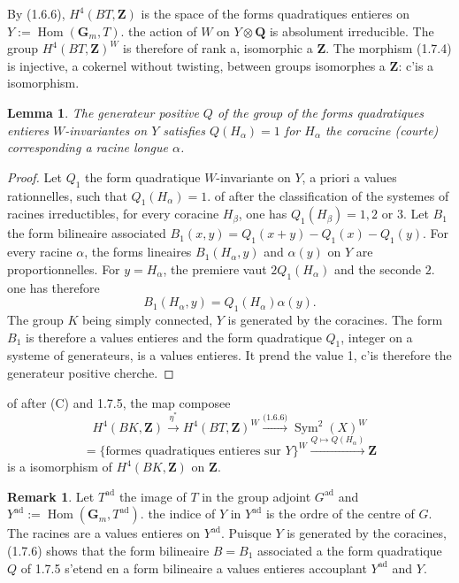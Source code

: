 \documentclass[11pt,a4paper]{article}
\theoremstyle{plain}
\newtheorem{lemma}[theorem]{Lemma}
\theoremstyle{definition}
\newtheorem{remark}[theorem]{Remark}
\DeclareMathOperator{\Sym}{Sym}
\DeclareMathOperator{\Hom}{Hom}
\DeclareMathOperator{\ad}{ad}
\begin{document}
By (1.6.6), $H^4(BT, \mathbf{Z})$ is the space of the forms quadratiques entieres on $Y := \Hom(\mathbf{G}_m, T)$. the action of $W$ on $Y \otimes \mathbf{Q}$ is absolument irreducible. The group $H^4(BT, \mathbf{Z})^W$ is therefore of rank a, isomorphic a $\mathbf{Z}$. The morphism (1.7.4) is injective, a cokernel without twisting, between groups isomorphes a $\mathbf{Z}$: c'is a isomorphism.

\begin{lemma}\label{1.7.5}
The generateur positive $Q$ of the group of the forms quadratiques entieres $W$-invariantes on $Y$ satisfies $Q(H_\alpha) = 1$ for $H_\alpha$ the coracine (courte) corresponding a racine longue $\alpha$.
\end{lemma}

\begin{proof}
Let $Q_1$ the form quadratique $W$-invariante on $Y$, a priori a values rationnelles, such that $Q_1(H_\alpha) = 1$. of after the classification of the systemes of racines irreductibles, for every coracine $H_\beta$, one has $Q_1(H_\beta) = 1, 2$ or $3$. Let $B_1$ the form bilineaire associated $B_1(x,y) = Q_1(x+y) - Q_1(x) - Q_1(y)$. For every racine $\alpha$, the forms lineaires $B_1(H_\alpha, y)$ and $\alpha(y)$ on $Y$ are proportionnelles. For $y = H_\alpha$, the premiere vaut $2Q_1(H_\alpha)$ and the seconde $2$. one has therefore
\begin{equation}\label{1.7.6}
B_1(H_\alpha, y) = Q_1(H_\alpha) \alpha(y).
\end{equation}
The group $K$ being simply connected, $Y$ is generated by the coracines. The form $B_1$ is therefore a values entieres and the form quadratique $Q_1$, integer on a systeme of generateurs, is a values entieres. It prend the value 1, c'is therefore the generateur positive cherche.
\end{proof}

of after (C) and 1.7.5, the map composee
\begin{equation}\label{1.7.7}
H^4(BK, \mathbf{Z}) \xrightarrow{\eta^*} H^4(BT, \mathbf{Z})^W \xrightarrow{\text{(1.6.6)}} \Sym^2(X)^W
\end{equation}
\[
= \{\text{formes quadratiques entieres sur } Y\}^W \xrightarrow{Q \mapsto Q(H_\alpha)} \mathbf{Z}
\]
is a isomorphism of $H^4(BK, \mathbf{Z})$ on $\mathbf{Z}$.

\begin{remark}\label{1.7.8}
Let $T^{\ad}$ the image of $T$ in the group adjoint $G^{\ad}$ and $Y^{\ad} := \Hom(\mathbf{G}_m, T^{\ad})$. the indice of $Y$ in $Y^{\ad}$ is the ordre of the centre of $G$. The racines are a values entieres on $Y^{\ad}$. Puisque $Y$ is generated by the coracines, (1.7.6) shows that the form bilineaire $B = B_1$ associated a the form quadratique $Q$ of 1.7.5 s'etend en a form bilineaire a values entieres accouplant $Y^{\ad}$ and $Y$.
\end{remark}
\end{document}
